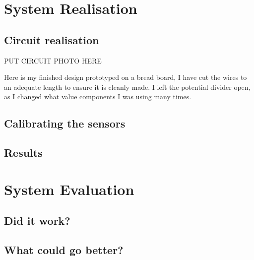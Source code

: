 \documentclass[a4paper,12pt]{article}
\begin{document}
{	\section{System Realisation} 
	\subsection{Circuit realisation}
	PUT CIRCUIT PHOTO HERE

	Here is my finished design prototyped on a bread board, I have cut the wires to an adequate length to ensure it is cleanly made.
	I left the potential divider open, as I changed what value components I was using many times.

	\subsection{Calibrating the sensors} 
	\subsection{Results}

	\section{System Evaluation} 
	\subsection{Did it work?} 
	\subsection{What could go better?}

	\newpage

	\printbibliography 
} 
\end{document}
